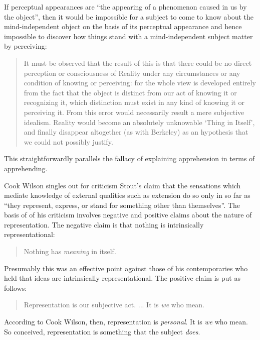 \documentclass[11pt]{article}
\begin{document}
If perceptual appearances are ``the appearing of a phenomenon caused in us by the object'', then it would be impossible for a subject to come to know about the mind-independent object on the basis of its perceptual appearance and hence impossible to discover how things stand with a mind-independent subject matter by perceiving:
\begin{quote}
	It must be observed that the result of this is that there could be no direct perception or consciousness of Reality under any circumstances or any condition of knowing or perceiving: for the whole view is developed entirely from the fact that the object is distinct from our act of knowing it or recognizing it, which distinction must exist in any kind of knowing it or perceiving it. From this error would necessarily result a mere subjective idealism. Reality would become an absolutely unknowable `Thing in Itself', and finally disappear altogether (as with Berkeley) as an hypothesis that we could not possibly justify.
\end{quote}
This straightforwardly parallels the fallacy of explaining apprehension in terms of apprehending. 

Cook Wilson singles out for criticism Stout’s claim that the sensations which mediate knowledge of external qualities such as extension do so only in so far as ``they represent, express, or stand for something other than themselves''. The basis of of his criticism involves negative and positive claims about the nature of representation. The negative claim is that nothing is intrinsically representational:
\begin{quote}
	Nothing has \emph{meaning} in itself. 
\end{quote}
Presumably this was an effective point against those of his contemporaries who held that ideas are intrinsically representational. The positive claim is put as follows: 
\begin{quote}
	Representation is our subjective act. ... It is \emph{we} who mean. 
\end{quote}
According to Cook Wilson, then, representation is \emph{personal}. It is \emph{we} who mean. So conceived, representation is something that the subject \emph{does}. 
\end{document}
